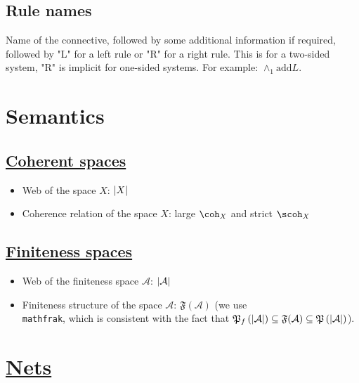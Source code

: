 \subsection{Rule names}\label{rule-names}

Name of the connective, followed by some additional information if
required, followed by "L" for a left rule or "R" for a right rule. This
is for a two-sided system, "R" is implicit for one-sided systems. For
example: $\wedge_1
\text{add} L$.

\section{Semantics}\label{semantics}

\subsection{\texorpdfstring{\hyperref[coherent-semantics]{Coherent spaces}}{Coherent spaces}}\label{coherent-spaces}

\begin{itemize}
\item Web of the space $X$: $\left|X\right|$
\item Coherence relation of the space $X$: large $\coh_X$ and strict $\scoh_X$
\end{itemize}

\subsection{\texorpdfstring{\hyperref[finiteness-semantics]{Finiteness spaces}}{Finiteness spaces}}\label{finiteness-spaces}

\begin{itemize}
\item
  Web of the finiteness space
  $\mathcal
  A$:
  $\left|\mathcal
  A\right|$
\item
  Finiteness structure of the space
  $\mathcal
  A$:
  $\mathfrak
  F(\mathcal A)$ (we use
  \texttt{\\mathfrak},
  which is consistent with the fact that
  $\mathfrak{P}_f\left(\left|\mathcal
  A\right|\right)\subseteq \mathfrak
  F(\mathcal A)
  \subseteq\mathfrak{P}\left(\left|\mathcal
  A\right|\right)$).
\end{itemize}

\section{\texorpdfstring{\hyperref[nets]{Nets}}{Nets}}

